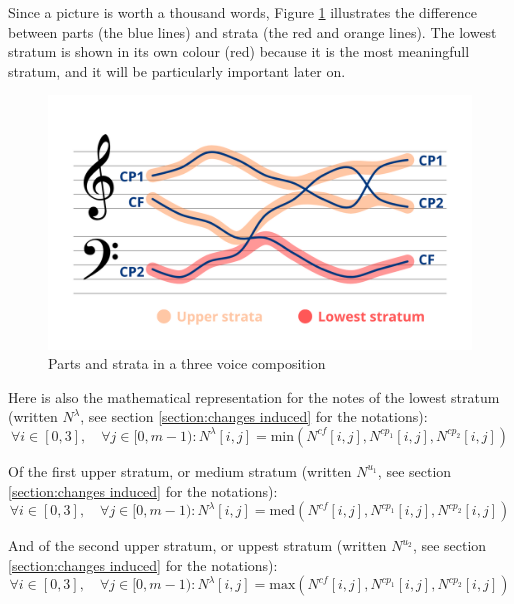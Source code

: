 Since a picture is worth a thousand words, Figure \ref{fig:lowest} illustrates the difference between parts (the blue lines) and strata (the red and orange lines). The lowest stratum is shown in its own colour (red) because it is the most meaningfull stratum, and it will be particularly important later on.

\begin{figure}[h]
  \centering
  \includegraphics[width=1\textwidth]{Images/lowest.png}
  \caption{Parts and strata in a three voice composition}
  \label{fig:lowest}
\end{figure}


Here is also the mathematical representation for the notes of the lowest stratum (written $N^{\lambda}$, see section \ref{section:changes induced} for the notations):
\begin{equation}
    \forall i \in [0, 3], \quad \forall j \in [0, m-1): N^{\lambda}[i,j] = \text{min} (N^{cf}[i,j], N^{cp_1}[i,j], N^{cp_2}[i,j])
\end{equation}

Of the first upper stratum, or medium stratum (written $N^{u_1}$, see section \ref{section:changes induced} for the notations):
\begin{equation}
    \forall i \in [0, 3], \quad \forall j \in [0, m-1): N^{\lambda}[i,j] = \text{med} (N^{cf}[i,j], N^{cp_1}[i,j], N^{cp_2}[i,j])
\end{equation}

And of the second upper stratum, or uppest stratum (written $N^{u_2}$, see section \ref{section:changes induced} for the notations):
\begin{equation}
    \forall i \in [0, 3], \quad \forall j \in [0, m-1): N^{\lambda}[i,j] = \text{max} (N^{cf}[i,j], N^{cp_1}[i,j], N^{cp_2}[i,j])
\end{equation}

